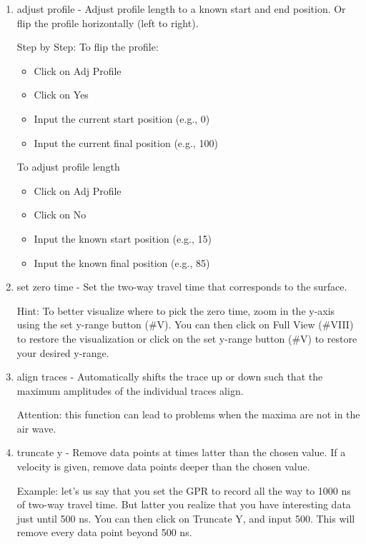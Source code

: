 \documentclass[12pt]{article}
\begin{document}
\begin{enumerate}

\item adjust profile - Adjust profile length to a known start and end position. Or flip the profile horizontally (left to right). 

Step by Step:
To flip the profile: 
\begin{itemize}
\item Click on Adj Profile
\item Click on Yes
\item Input the current start position (e.g., 0)
\item Input the current final position (e.g., 100)
\end{itemize}

To adjust profile length
\begin{itemize}
\item Click on Adj Profile
\item Click on No
\item Input the known start position (e.g., 15)
\item Input the known final position (e.g., 85)
\end{itemize}

\item set zero time - Set the two-way travel time that corresponds to the surface.

Hint: To better visualize where to pick the zero time, zoom in the y-axis using the set y-range button (\#V). 
You can then click on Full View (\#VIII) to restore the visualization or click on the set y-range button (\#V) to restore your desired y-range.


\item align traces - Automatically shifts the trace up or down such that the maximum amplitudes of the individual traces align. 

Attention: this function can lead to problems when the maxima are not in the air wave.


\item truncate y - Remove data points at times latter than the chosen value. If a velocity is given, remove data points deeper than the chosen value.

Example: let’s us say that you set the GPR to record all the way to 1000 ns of two-way travel time. But latter you realize that you have interesting data just until 500 ns. You can then click on Truncate Y, and input 500. This will remove every data point beyond 500 ns. 



\end{enumerate}
\end{document}

